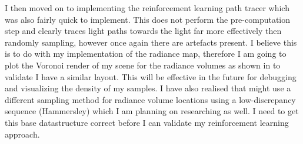 \documentclass[conference]{IEEEtran}
\begin{document}
I then moved on to implementing the reinforcement learning path tracer which was also fairly quick to implement. This does not perform the pre-computation step and clearly traces light paths towards the light far more effectively then randomly sampling, however once again there are artefacts present. I believe this is to do with my implementation of the radiance map, therefore I am going to plot the Voronoi render of my scene for the radiance volumes as shown in \cite{dahm2017learning} to validate I have a similar layout. This will be effective in the future for debugging and visualizing the density of my samples. I have also realised that \cite{dahm2017learning} might use a different sampling method for radiance volume locations using a low-discrepancy sequence  (Hammersley) which I am planning on researching as well. I need to get this base datastructure correct before I can validate my reinforcement learning approach.



\end{document}
